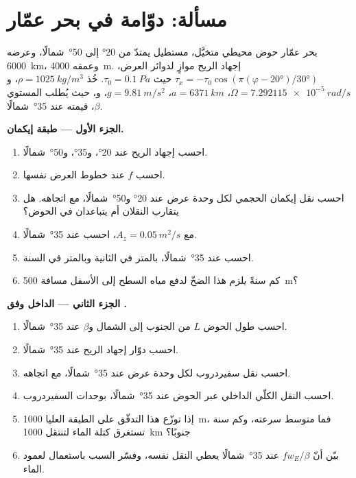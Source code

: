\section{مسألة: دوّامة في بحر عمّار}

\begin{problem}
\label{pb:b3:ocean-dynamics:1}
بحر عمّار حوض محيطي متخيَّل، مستطيل يمتدّ من \ang{20} إلى
\ang{50}~شمالًا، وعرضه \qty{6000}{km}، وعمقه \qty{4000}{m}. إجهاد الريح
موازٍ لدوائر العرض، $\tau_x = -\tau_0\cos(\pi(\varphi - \ang{20})/\ang{30})$ حيث $\tau_0
= \qty{0.1}{Pa}$. خُذ $\rho = \qty{1025}{kg/m^3}$، و$\Omega =
\qty{7.292115e-5}{rad/s}$، $a = \qty{6371}{km}$، $g = \qty{9.81}{m/s^2}$،
و، حيث يُطلب المستوي $\beta$، قيمته عند \ang{35}~شمالًا.

\medskip\noindent\textbf{الجزء الأول --- طبقة إيكمان.}
\begin{enumerate}
\item احسب إجهاد الريح عند \ang{20}، و\ang{35}، و\ang{50}~شمالًا.
\item احسب $f$ عند خطوط العرض نفسها.
\item احسب نقل إيكمان الحجمي لكل وحدة عرض عند \ang{20}
  و\ang{50}~شمالًا، مع اتجاهه. هل يتقارب النقلان أم يتباعدان في
    الحوض؟
\item مع $A_z = \qty{0.05}{m^2/s}$، احسب  عند \ang{35}~شمالًا.
\item احسب  عند \ang{35}~شمالًا، بالمتر في الثانية وبالمتر
  في السنة.
\item كم سنةً يلزم هذا الضخّ لدفع مياه السطح
  إلى الأسفل مسافة \qty{500}{m}؟
\end{enumerate}

\medskip\noindent\textbf{الجزء الثاني --- الداخل وفق .}
\begin{enumerate}[resume]
\item احسب طول الحوض $L$ من الجنوب إلى الشمال و$\beta$ عند
  \ang{35}~شمالًا.
\item احسب دوّار إجهاد الريح عند \ang{35}~شمالًا.
\item احسب نقل سفيردروب لكل وحدة عرض عند \ang{35}~شمالًا، مع
  اتجاهه.
\item احسب النقل الكلّي الداخلي عبر الحوض عند \ang{35}~شمالًا،
  بوحدات السفيردروب.
\item إذا توزّع هذا التدفّق على الطبقة العليا \qty{1000}{m}، فما
  متوسط سرعته، وكم سنة تستغرق كتلة الماء لتنتقل \qty{1000}{km}
  جنوبًا؟
\item بيّن أنّ $fw_E/\beta$ عند \ang{35}~شمالًا يعطي النقل نفسه،
  وفسّر السبب باستعمال  لعمود الماء.
\end{enumerate}


\end{problem}

